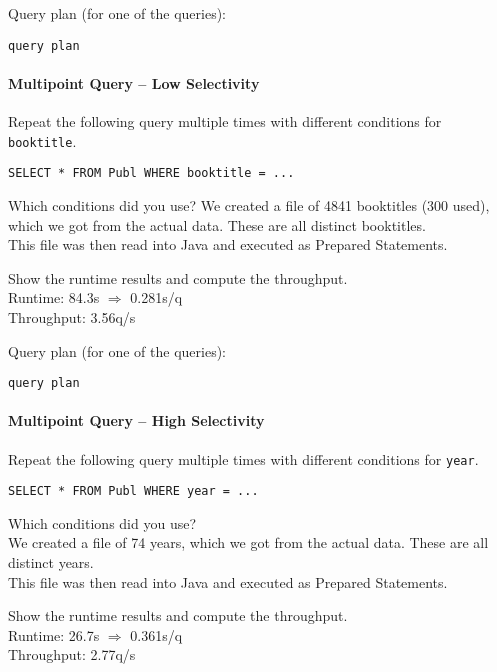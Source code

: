 \documentclass[11pt]{scrartcl}
\begin{document}
\smallskip\noindent
Query plan (for one of the queries):
{\small
\begin{verbatim}
query plan
\end{verbatim}
}


\paragraph{Multipoint Query -- Low Selectivity}

Repeat the following query multiple times with different conditions for {\tt booktitle}.

{\small
\begin{verbatim}
SELECT * FROM Publ WHERE booktitle = ...
\end{verbatim}
}

\noindent
Which conditions did you use?
We created a file of 4841 booktitles (300 used), which we got from the actual data. These are all distinct booktitles.\\
This file was then read into Java and executed as Prepared Statements.

\smallskip\noindent
Show the runtime results and compute the throughput.\\
Runtime: 84.3s $\Rightarrow$ 0.281s/q\\
Throughput: 3.56q/s

\smallskip\noindent
Query plan (for one of the queries):
{\small
\begin{verbatim}
query plan
\end{verbatim}
}


\paragraph{Multipoint Query -- High Selectivity}

Repeat the following query multiple times with different conditions for {\tt year}.

{\small
\begin{verbatim}
SELECT * FROM Publ WHERE year = ...
\end{verbatim}
}

\noindent
Which conditions did you use?\\
We created a file of 74 years, which we got from the actual data. These are all distinct years.\\
This file was then read into Java and executed as Prepared Statements.

\smallskip\noindent
Show the runtime results and compute the throughput.\\
Runtime: 26.7s $\Rightarrow$ 0.361s/q\\
Throughput: 2.77q/s
\end{document}
